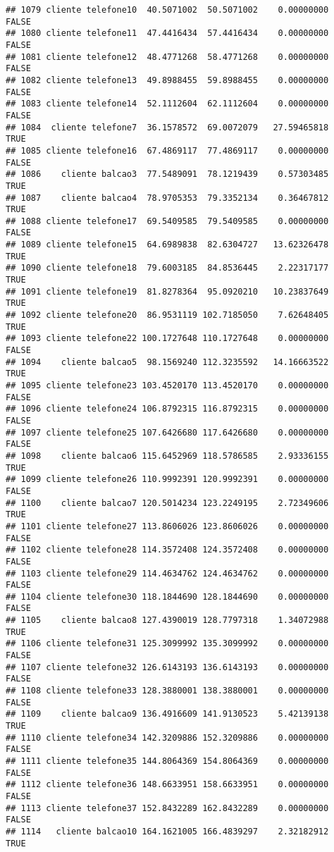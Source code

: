 \documentclass[
]{article}
\begin{document}
\begin{verbatim}
## 1079 cliente telefone10  40.5071002  50.5071002    0.00000000    FALSE
## 1080 cliente telefone11  47.4416434  57.4416434    0.00000000    FALSE
## 1081 cliente telefone12  48.4771268  58.4771268    0.00000000    FALSE
## 1082 cliente telefone13  49.8988455  59.8988455    0.00000000    FALSE
## 1083 cliente telefone14  52.1112604  62.1112604    0.00000000    FALSE
## 1084  cliente telefone7  36.1578572  69.0072079   27.59465818     TRUE
## 1085 cliente telefone16  67.4869117  77.4869117    0.00000000    FALSE
## 1086    cliente balcao3  77.5489091  78.1219439    0.57303485     TRUE
## 1087    cliente balcao4  78.9705353  79.3352134    0.36467812     TRUE
## 1088 cliente telefone17  69.5409585  79.5409585    0.00000000    FALSE
## 1089 cliente telefone15  64.6989838  82.6304727   13.62326478     TRUE
## 1090 cliente telefone18  79.6003185  84.8536445    2.22317177     TRUE
## 1091 cliente telefone19  81.8278364  95.0920210   10.23837649     TRUE
## 1092 cliente telefone20  86.9531119 102.7185050    7.62648405     TRUE
## 1093 cliente telefone22 100.1727648 110.1727648    0.00000000    FALSE
## 1094    cliente balcao5  98.1569240 112.3235592   14.16663522     TRUE
## 1095 cliente telefone23 103.4520170 113.4520170    0.00000000    FALSE
## 1096 cliente telefone24 106.8792315 116.8792315    0.00000000    FALSE
## 1097 cliente telefone25 107.6426680 117.6426680    0.00000000    FALSE
## 1098    cliente balcao6 115.6452969 118.5786585    2.93336155     TRUE
## 1099 cliente telefone26 110.9992391 120.9992391    0.00000000    FALSE
## 1100    cliente balcao7 120.5014234 123.2249195    2.72349606     TRUE
## 1101 cliente telefone27 113.8606026 123.8606026    0.00000000    FALSE
## 1102 cliente telefone28 114.3572408 124.3572408    0.00000000    FALSE
## 1103 cliente telefone29 114.4634762 124.4634762    0.00000000    FALSE
## 1104 cliente telefone30 118.1844690 128.1844690    0.00000000    FALSE
## 1105    cliente balcao8 127.4390019 128.7797318    1.34072988     TRUE
## 1106 cliente telefone31 125.3099992 135.3099992    0.00000000    FALSE
## 1107 cliente telefone32 126.6143193 136.6143193    0.00000000    FALSE
## 1108 cliente telefone33 128.3880001 138.3880001    0.00000000    FALSE
## 1109    cliente balcao9 136.4916609 141.9130523    5.42139138     TRUE
## 1110 cliente telefone34 142.3209886 152.3209886    0.00000000    FALSE
## 1111 cliente telefone35 144.8064369 154.8064369    0.00000000    FALSE
## 1112 cliente telefone36 148.6633951 158.6633951    0.00000000    FALSE
## 1113 cliente telefone37 152.8432289 162.8432289    0.00000000    FALSE
## 1114   cliente balcao10 164.1621005 166.4839297    2.32182912     TRUE

\end{verbatim}
\end{document}
